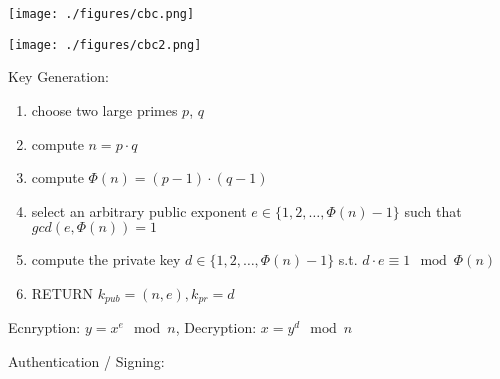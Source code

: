\documentclass[landscape, a4paper]{article}
\begin{document}
\begin{minipage}[t]{0.2\linewidth}
\begin{betterlist}
\begin{betterlist}
			\texttt{[image: ./figures/cbc.png]}

			\texttt{[image: ./figures/cbc2.png]}
		\end{betterlist}
	\end{betterlist}
	\begin{betterlist}
		\item \alert{Key Generation:}
		\begin{enumerate}
			\item choose two large primes $p$, $q$
			\item compute $n = p \cdot q$
			\item compute $\Phi(n) = (p - 1) \cdot (q - 1)$
			\item select an arbitrary public exponent $e \in \{1, 2, \ldots, \Phi(n) - 1\}$ such that $gcd(e, \Phi(n) ) = 1$
			\item compute the private key $d \in \{1, 2, \ldots , \Phi(n) - 1\}$ s.t. $d \cdot e \equiv 1 \mod \Phi(n)$
			\item RETURN $k_{pub} = (n, e), k_{pr} = d$
		\end{enumerate}
		\item \alert{Ecnryption:} $y = x^e \mod n$, \alert{Decryption:} $x = y^d \mod n$
		\item \alert{Authentication / Signing:}
		\begin{betterlist}

\end{betterlist}
\end{betterlist}
\end{minipage}
\end{document}

